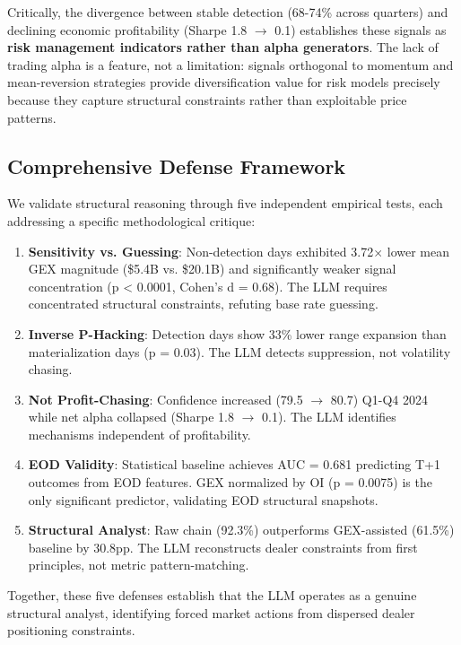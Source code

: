 Critically, the divergence between stable detection (68-74\% across quarters) and declining economic profitability (Sharpe 1.8 $\rightarrow$ 0.1) establishes these signals as \textbf{risk management indicators rather than alpha generators}. The lack of trading alpha is a feature, not a limitation: signals orthogonal to momentum and mean-reversion strategies provide diversification value for risk models precisely because they capture structural constraints rather than exploitable price patterns.

\subsection{Comprehensive Defense Framework}

We validate structural reasoning through five independent empirical tests, each addressing a specific methodological critique:

\begin{enumerate}
    \item \textbf{Sensitivity vs. Guessing}: Non-detection days exhibited 3.72$\times$ lower mean GEX magnitude (\$5.4B vs. \$20.1B) and significantly weaker signal concentration (p < 0.0001, Cohen's d = 0.68). The LLM requires concentrated structural constraints, refuting base rate guessing.

    \item \textbf{Inverse P-Hacking}: Detection days show 33\% lower range expansion than materialization days (p = 0.03). The LLM detects suppression, not volatility chasing.

    \item \textbf{Not Profit-Chasing}: Confidence increased (79.5 $\rightarrow$ 80.7) Q1-Q4 2024 while net alpha collapsed (Sharpe 1.8 $\rightarrow$ 0.1). The LLM identifies mechanisms independent of profitability.

    \item \textbf{EOD Validity}: Statistical baseline achieves AUC = 0.681 predicting T+1 outcomes from EOD features. GEX normalized by OI (p = 0.0075) is the only significant predictor, validating EOD structural snapshots.

    \item \textbf{Structural Analyst}: Raw chain (92.3\%) outperforms GEX-assisted (61.5\%) baseline by 30.8pp. The LLM reconstructs dealer constraints from first principles, not metric pattern-matching.
\end{enumerate}

Together, these five defenses establish that the LLM operates as a genuine structural analyst, identifying forced market actions from dispersed dealer positioning constraints.


